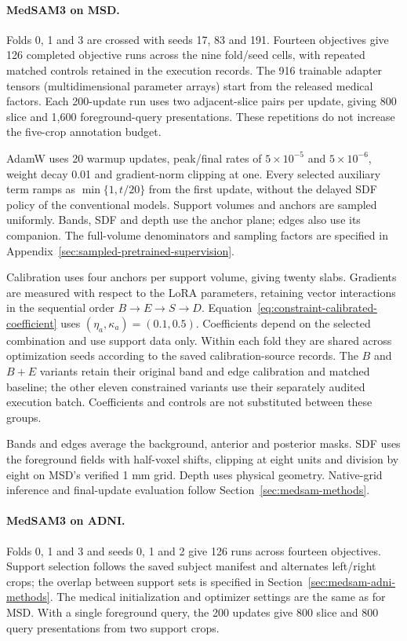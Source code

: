 \documentclass[12pt,a4paper]{article}
\begin{document}
\paragraph{MedSAM3 on MSD.}\label{sec:medsam-methods-details}
Folds 0, 1 and 3 are crossed with seeds 17, 83 and 191. Fourteen
objectives give 126 completed objective runs across the
nine fold/seed cells, with repeated matched controls retained in the
execution records. The 916 trainable adapter tensors (multidimensional parameter arrays)
start from the
released medical factors. Each 200-update run uses two adjacent-slice pairs per update,
giving 800 slice and 1,600 foreground-query presentations. These
repetitions do not increase the five-crop annotation budget.

AdamW uses 20 warmup updates, peak/final rates of $5\times10^{-5}$
and $5\times10^{-6}$, weight decay 0.01 and gradient-norm clipping
at one. Every selected auxiliary term ramps as $\min\{1,t/20\}$
from the first update, without the delayed SDF policy of the conventional
models. Support volumes and anchors are sampled uniformly. Bands,
SDF and depth use the anchor plane; edges also use its companion.
The full-volume denominators and sampling factors are specified in
Appendix~\ref{sec:sampled-pretrained-supervision}.

Calibration uses four anchors per support volume, giving twenty
slabs. Gradients are measured with respect to the LoRA parameters,
retaining vector interactions in the sequential order
$B\to E\to S\to D$. Equation~\ref{eq:constraint-calibrated-coefficient}
uses $(\eta_a,\kappa_a)=(0.1,0.5)$. Coefficients depend on the selected
combination and use support data only. Within each fold they are shared
across optimization seeds according to the saved calibration-source
records. The $B$ and $B+E$ variants retain their original band and edge
calibration and matched baseline; the other eleven constrained variants
use their separately audited execution batch. Coefficients and controls
are not substituted between these groups.

Bands and edges average the background, anterior and posterior masks.
SDF uses the foreground fields with half-voxel shifts, clipping at eight
units and division by eight on MSD's verified 1 mm grid. Depth uses
physical geometry. Native-grid inference and final-update evaluation
follow Section~\ref{sec:medsam-methods}.

\paragraph{MedSAM3 on ADNI.}\label{sec:medsam-adni-methods-details}
Folds 0, 1 and 3 and seeds 0, 1 and 2 give 126 runs across fourteen
objectives. Support selection follows the saved subject manifest and
alternates left/right crops; the overlap between support sets is
specified in Section~\ref{sec:medsam-adni-methods}. The medical
initialization and optimizer settings are the same as for MSD.
With a single foreground query, the 200 updates give 800 slice and
800 query presentations from two support crops.
\end{document}

